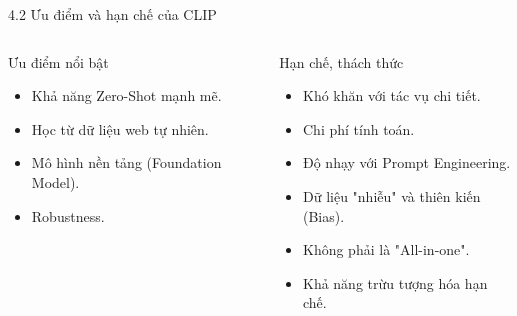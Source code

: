\begin{frame}{4.2 Ưu điểm và hạn chế của CLIP}
    \begin{columns}[T]
        \begin{column}{0.5\textwidth}
            \begin{block}{Ưu điểm nổi bật}
                \begin{itemize}
                    \item Khả năng Zero-Shot mạnh mẽ.
                    \item Học từ dữ liệu web tự nhiên.
                    \item Mô hình nền tảng (Foundation Model).
                    \item Robustness.
                \end{itemize}
            \end{block}
        \end{column}

        \begin{column}{0.5\textwidth}
            \begin{block}{Hạn chế, thách thức}
                \begin{itemize}
                    \item Khó khăn với tác vụ chi tiết.
                    \item Chi phí tính toán.
                    \item Độ nhạy với Prompt Engineering.
                    \item Dữ liệu "nhiễu" và thiên kiến (Bias).
                    \item Không phải là "All-in-one".
                    \item Khả năng trừu tượng hóa hạn chế.
                \end{itemize}
            \end{block}
        \end{column}
    \end{columns}
\end{frame}